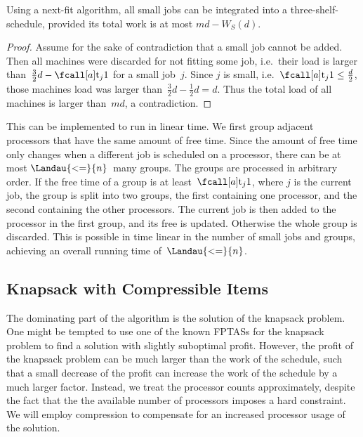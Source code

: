 \begin{lemma}
  \label{lemma:small}
  Using a next-fit algorithm, all small jobs can be integrated into a three-shelf-schedule,
  provided its total work is at most $md - W_S(d)$. 
\end{lemma}

\begin{proof}
  Assume for the sake of contradiction that a small job cannot be added.
  Then all machines were discarded for not fitting some job,
  i.e.~their load is larger than~$\frac{3}{2}d - \ptm{j}{1}$ for a small job~$j$.
  Since $j$ is small, i.e.~$\ptm{j}{1} \leq \frac{d}{2}$,
  those machines load was larger than~$\frac{3}{2}d - \frac{1}{2}d = d$.
  Thus the total load of all machines is larger than~$md$, a contradiction.
\end{proof}

This can be implemented to run in linear time.
We first group adjacent processors that have the same amount of free time.
Since the amount of free time only changes when a different job is scheduled on a processor,
there can be at most $\Landau{<=}{n}$~many groups.
The groups are processed in arbitrary order.
If the free time of a group is at least~$\ptm{j}{1}$, where $j$ is the current job,
the group is split into two groups,
the first containing one processor, and the second containing the other processors.
The current job is then added to the processor in the first group, and its free is updated.
Otherwise the whole group is discarded.
This is possible in time linear in the number of small jobs and groups,
achieving an overall running time of~$\Landau{<=}{n}$.


\subsection{Knapsack with Compressible Items}
\label{sec:fully-polynomial}

The dominating part of the algorithm is the solution of the knapsack problem.
One might be tempted to use one of the known FPTASs for the knapsack problem
to find a solution with slightly suboptimal profit.
However, the profit of the knapsack problem can be much larger than the work of the schedule,
such that a small decrease of the profit
can increase the work of the schedule by a much larger factor.
Instead, we treat the processor counts approximately,
despite the fact that the the available number of processors imposes a hard constraint.
We will employ compression to compensate for an increased processor usage of the solution.

